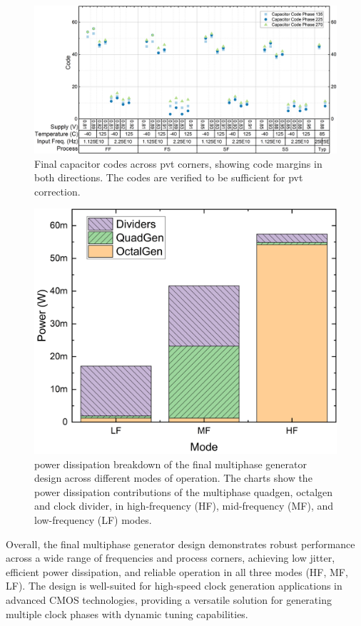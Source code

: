 \begin{figure}[htbp]
  \centering
  \includegraphics[width=0.8\linewidth]{figures/Results/Final_HF_LF_MF-Pivot_CapCodes_HF.png}
  \caption{Final capacitor codes across \gls{pvt} corners, showing code margins in both directions. The codes are verified to be sufficient for \gls{pvt} correction.}
  \label{fig:final_codes}
\end{figure}
\begin{figure}[ht]
  \centering
  \includegraphics[width=0.4\linewidth]{figures/Results/Final_HF_LF_MF-power_distributions_LFMFHF.png}
  \caption{power dissipation breakdown of the final multiphase generator design across different modes of operation. The charts show the power dissipation contributions of the multiphase \gls{quadgen}, \gls{octalgen} and clock divider, in high-frequency (HF), mid-frequency (MF), and low-frequency (LF) modes.}
  \label{fig:power_consumption}
\end{figure}
Overall, the final multiphase generator design demonstrates robust performance across a wide range of frequencies and process corners, achieving low jitter, efficient power dissipation, and reliable operation in all three modes (HF, MF, LF). The design is well-suited for high-speed clock generation applications in advanced CMOS technologies, providing a versatile solution for generating multiple clock phases with dynamic tuning capabilities.
